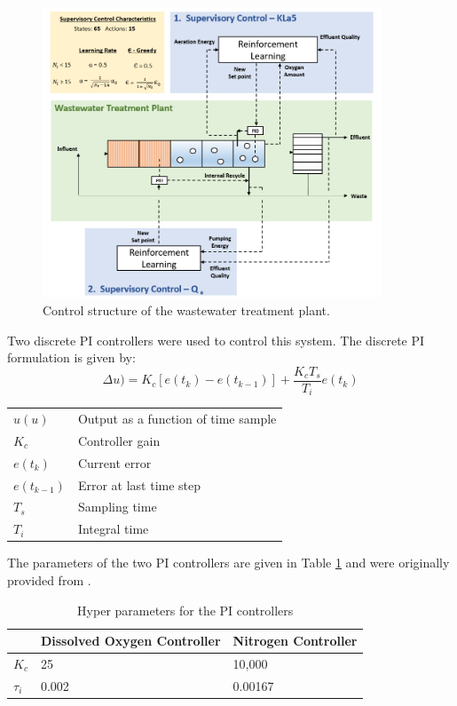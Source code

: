 \begin{figure}
    \centering
    \includegraphics[width=0.9\textwidth]{images/ch4/supervisory_control.png}
    \caption{Control structure of the wastewater treatment plant.}
    \label{fig:04wwtp_rl}
\end{figure}

Two discrete PI controllers were used to control this system.  The discrete PI formulation is given by:
\begin{equation}
    \Delta u) = K_c[e(t_k) - e(t_{k-1})] + \dfrac{K_cT_s}{T_i}e(t_k)
    \label{eq:04discrete_pid}
\end{equation}
\begin{table}[H]
	\begin{tabular}{p{1.5cm}p{6.5cm}}
	$u(u)$ & Output as a function of time sample \\
	$K_c$ & Controller gain \\
	$e(t_k)$ & Current error \\
	$e(t_{k-1})$ & Error at last time step \\
	$T_s$ & Sampling time \\
	$T_i$ & Integral time \\
	\end{tabular}
\end{table}

The parameters of the two PI controllers are given in Table \ref{tab04:pi_parameters} and were originally provided from \cite{wwtp}.

\begin{table}[h]
	\begin{center}
	\def\arraystretch{1.2}
	\begin{tabular}{p{1.5cm}p{5.5cm}p{5.5cm}}
	\hline
	 & Dissolved Oxygen Controller & Nitrogen Controller \\
	 \hline
	 $K_c$ & 25 & 10,000 \\
	 $\tau_i$ & 0.002 & 0.00167 \\
	\hline
	\end{tabular}
	\end{center}
	\caption{Hyper parameters for the PI controllers}
	\label{tab04:pi_parameters}
\end{table}

